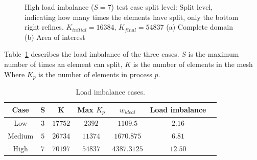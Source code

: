 \begin{figure}[H]
	\centering
	\hfill
	\caption{High load imbalance (\(S = 7\)) test case split level: Split level, indicating how many times the elements have split, only the bottom right refines. \(K_{initial} = 16384\), \(K_{final} = 54837\) (a) Complete domain (b) Area of interest}\label{fig:load_imbalance_case_high_s}
\end{figure}


Table~\ref{table:load_imbalance} describes the load imbalance of the three cases. \(S\) is the
maximum number of times an element can split, \(K\) is the number of elements in the mesh
Where \(K_p\) is the number of elements in process \(p\).

\begin{table}[H]
	\centering
	\begin{tabular}{ c c c c c c c }
		Case & S & K & Max \(K_p\) & \(w_{ideal}\) & Load imbalance \\
		\midrule
		Low & \(3\) & \(17752\) & \(2392\) & \(1109.5\) & \(2.16\) \\
		Medium & \(5\) & \(26734\) & \(11374\) & \(1670.875\) & \(6.81\) \\
		High & \(7\) & \(70197\) & \(54837\) & \(4387.3125\) & \(12.50\) \\
	\end{tabular}
	\caption{Load imbalance cases.}\label{table:load_imbalance}
\end{table}


